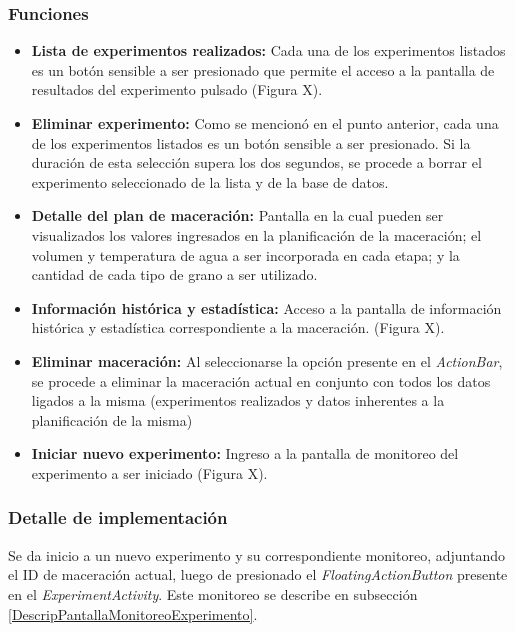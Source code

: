             \subsubsection{Funciones}
                \begin{itemize}
                    \item \textbf{Lista de experimentos realizados:} Cada una de los experimentos listados es un botón sensible a ser presionado que permite el acceso a la pantalla de resultados del experimento pulsado (Figura X).
                    
                    \item \textbf{Eliminar experimento:} Como se mencionó en el punto anterior, cada una de los experimentos listados es un botón sensible a ser presionado. Si la duración de esta selección supera los dos segundos, se procede a borrar el experimento seleccionado de la lista y de la base de datos.
                    
                    \item \textbf{Detalle del plan de maceración:} Pantalla en la cual pueden ser visualizados los valores ingresados en la planificación de la maceración; el volumen y temperatura de agua a ser incorporada en cada etapa; y la cantidad de cada tipo de grano a ser utilizado.
                    
                    \item \textbf{Información histórica y estadística:} Acceso a la pantalla de información histórica y estadística correspondiente a la maceración. (Figura X).
                    
                    \item \textbf{Eliminar maceración:} Al seleccionarse la opción presente en el \textit{ActionBar}, se procede a eliminar la maceración actual en conjunto con todos los datos ligados a la misma (experimentos realizados y datos inherentes a la planificación de la misma)
                    
                    \item \textbf{Iniciar nuevo experimento:} Ingreso a la pantalla de monitoreo del experimento a ser iniciado (Figura X).
                    
                \end{itemize}
            
            \subsubsection{Detalle de implementación}
                \par Se da inicio a un nuevo experimento y su correspondiente monitoreo, adjuntando el ID de maceración actual, luego de presionado el \textit{FloatingActionButton} presente en el \textit{ExperimentActivity}. Este monitoreo se describe en subsección \ref{DescripPantallaMonitoreoExperimento}.
            
